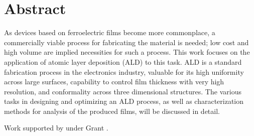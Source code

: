 \newpage
\chapter*{Abstract}


\noindent {}

As devices based on ferroelectric films become more commonplace, a commercially viable process for fabricating the material is needed; low cost and high volume are implied necessities for such a process. This work focuses on the application of atomic layer deposition (ALD) to this task. ALD is a standard fabrication process in the electronics industry, valuable for its high uniformity across large surfaces, capability to control film thickness with very high resolution, and conformality across three dimensional structures. The various tasks in designing and optimizing an ALD process, as well as characterization methods for analysis of the produced films, will be discussed in detail.

Work supported by  under Grant .